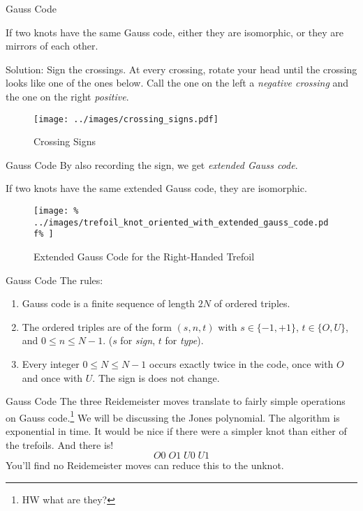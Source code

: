\documentclass{beamer}
\begin{document}
    \begin{frame}{Gauss Code}
        \begin{theorem}
            If two knots have the same Gauss code, either they are isomorphic,
            or they are mirrors of each other.
        \end{theorem}
        Solution: Sign the crossings. At every crossing, rotate your head until
        the crossing looks like one of the ones below. Call the one on the left
        a \textit{negative crossing} and the one on the right \textit{positive}.
        \begin{figure}
            \centering
            \texttt{[image: ../images/crossing\_signs.pdf]}
            \caption{Crossing Signs}
            \label{fig:crossing_signs}
        \end{figure}
    \end{frame}
    \begin{frame}{Gauss Code}
        By also recording the sign, we get \textit{extended Gauss code}.
        \begin{theorem}
            If two knots have the same extended Gauss code, they are isomorphic.
        \end{theorem}
        \begin{figure}
            \centering
            \texttt{[image: \%
                ../images/trefoil\_knot\_oriented\_with\_extended\_gauss\_code.pdf\%
            ]}
            \caption{Extended Gauss Code for the Right-Handed Trefoil}
            \label{fig:right_hand_trefoil_extended_gauss}
        \end{figure}
    \end{frame}
    \begin{frame}{Gauss Code}
        The rules:
        \begin{enumerate}
            \item Gauss code is a finite sequence of length $2N$ of ordered
                  triples.
            \item The ordered triples are of the form $(s,n,t)$ with
                  $s\in\{-1,+1\}$, $t\in\{O,U\}$, and $0\leq{n}\leq{N-1}$.
                  ($s$ for \textit{sign}, $t$ for \textit{type}).
            \item Every integer $0\leq{N}\leq{N-1}$ occurs exactly twice in the
                  code, once with $O$ and once with $U$. The sign is does not
                  change.
        \end{enumerate}
    \end{frame}
    \begin{frame}{Gauss Code}
        The three Reidemeister moves translate to fairly simple operations on
        Gauss code.\footnote{HW what are they?}
        We will be discussing the Jones polynomial. The algorithm is exponential
        in time. It would be nice if there were a simpler knot than either of
        the trefoils. And there is!
        \begin{equation}
            O0\;O1\;U0\;U1
        \end{equation}
        You'll find no Reidemeister moves can reduce this to the unknot.
    \end{frame}
\end{document}
